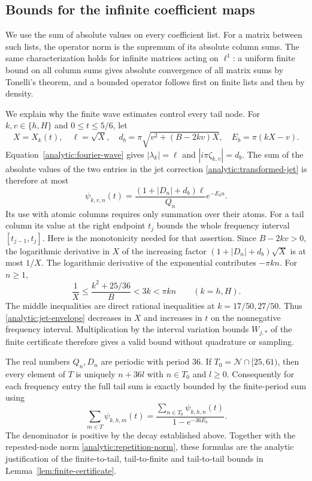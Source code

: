 \documentclass[11pt]{article}
\theoremstyle{remark}\newtheorem{remark}[theorem]{Remark}
\begin{document}
\subsection{Bounds for the infinite coefficient maps}

We use the sum of absolute values on every coefficient list. For a
matrix between such lists, the operator norm is the supremum of its
absolute column sums. The same characterization holds for infinite
matrices acting on $\ell^1$: a uniform finite bound on all column sums
gives absolute convergence of all matrix sums by Tonelli's theorem, and
a bounded operator follows first on finite lists and then by density.

We explain why the finite wave estimates control every tail node.
For $k,v\in\{h,H\}$ and $0\le t\le5/6$, let
\[
 X=X_k(t),\quad \ell=\sqrt X,
 \quad d_b=\pi\sqrt{v^2+(B-2kv)X},
 \quad E_b=\pi(kX-v).
\]
Equation~\eqref{analytic:fourier-wave} gives
$|\lambda_k|=\ell$ and $|i\pi\zeta_{k,v}|=d_b$.
The sum of the absolute values of the two entries in the jet correction
\eqref{analytic:transformed-jet} is therefore at most
\begin{equation}
 \psi_{k,v,n}(t)
 =\frac{(1+|D_n|+d_b)\ell}{Q_n}e^{-E_bn}.
 \label{analytic:jet-envelope}
\end{equation}
Its use with atomic columns requires only summation over their atoms.
For a tail column its value at the right endpoint $t_j$ bounds the
whole frequency interval $[t_{j-1},t_j]$. Here is the monotonicity
needed for that assertion. Since $B-2kv>0$, the logarithmic derivative
in $X$ of the increasing factor $(1+|D_n|+d_b)\sqrt X$ is at most
$1/X$. The logarithmic derivative of the exponential contributes
$-\pi kn$. For $n\ge1$,
\[
 \frac1X\le\frac{k^2+25/36}{B}<3k<\pi kn
 \qquad(k=h,H).
\]
The middle inequalities are direct rational inequalities at
$k=17/50,27/50$. Thus \eqref{analytic:jet-envelope} decreases in $X$
and increases in $t$ on the nonnegative frequency interval.
Multiplication by the interval variation bounds $W_{j,*}$ of the finite certificate therefore
gives a valid bound without quadrature or sampling.

The real numbers $Q_n,D_n$ are periodic with period $36$.
If $T_0=\mathcal N\cap[25,61)$, then every element of $T$ is uniquely
$n+36l$ with $n\in T_0$ and $l\ge0$. Consequently for each frequency
entry the full tail sum is exactly bounded by the finite-period sum
using
\begin{equation}
 \sum_{m\in T}\psi_{k,h,m}(t)
 =\frac{\sum_{n\in T_0}\psi_{k,h,n}(t)}{1-e^{-36E_b}}.
 \label{analytic:tail-geometric-sum}
\end{equation}
The denominator is positive by the decay established above.
Together with the repeated-node norm
\eqref{analytic:repetition-norm}, these formulas are the analytic
justification of the finite-to-tail, tail-to-finite and tail-to-tail
bounds in Lemma~\ref{lem:finite-certificate}.
\end{document}
